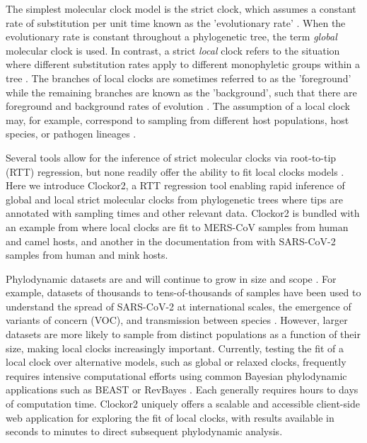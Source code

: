 \documentclass{article}
\begin{document}
The simplest molecular clock model is the strict clock, which assumes a constant rate of substitution per unit time known as the 'evolutionary rate' \citep{zuckerkandl_evolutionary_1965}. When the evolutionary rate is constant throughout a phylogenetic tree, the term \emph{global} molecular clock is used. In contrast, a strict \emph{local} clock refers to the situation where different substitution rates apply to different monophyletic groups within a tree \citep{ho2014molecular}. The branches of local clocks are sometimes referred to as the 'foreground' while the remaining branches are known as the 'background', such that there are foreground and background rates of evolution \citep{yoder2000estimation}. The assumption of a local clock may, for example, correspond to  sampling from different host populations, host species, or pathogen lineages \citep{worobey_synchronized_2014}. 

Several tools allow for the inference of strict molecular clocks via root-to-tip (RTT) regression, but none readily offer the ability to fit local clocks models \citep{rambaut_exploring_2016, hadfield_nextstrain_2018,sagulenko_treetime_2018,volz_scalable_2017}. Here we introduce Clockor2, a RTT regression tool enabling rapid inference of global and local strict molecular clocks from phylogenetic trees where tips are annotated with sampling times and other relevant data. Clockor2 is bundled with an example from \citet{dudas_mers-cov_2018} where local clocks are fit to MERS-CoV samples from human and camel hosts, and another in the documentation from \citet{porter2023evolutionary} with SARS-CoV-2 samples from human and mink hosts.

Phylodynamic datasets are and will continue to grow in size and scope \citep{featherstone2022epidemiological}. For example, datasets of thousands to tens-of-thousands of samples have been used to understand the spread of SARS-CoV-2 at international scales, the emergence of variants of concern (VOC), and transmission between species \citep{du_plessis_establishment_2021,hill_origins_2022,nadeau_swiss_2023,porter2023evolutionary}. However, larger datasets are more likely to sample from distinct populations as a function of their size, making local clocks increasingly important. Currently, testing the fit of a local clock over alternative models, such as global or relaxed clocks, frequently requires intensive computational efforts using common Bayesian phylodynamic applications such as BEAST or RevBayes \citep{bouckaert_beast_2019, suchard_bayesian_2018, hoehna_2016_revbayes, drummond2007beast, drummond2012bayesian}. Each generally requires hours to days of computation time. Clockor2 uniquely offers a scalable and accessible client-side web application for exploring the fit of local clocks, with results available in seconds to minutes to direct subsequent phylodynamic analysis.
\end{document}
